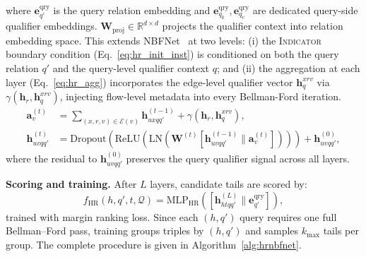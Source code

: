 \documentclass[10pt,journal,compsoc]{IEEEtran}
\begin{document}
where $\mathbf{e}_{q'}^{\mathrm{qry}}$ is the
query relation embedding and
$\mathbf{e}_{q_k}^{\mathrm{qry}},
\mathbf{e}_{q_v}^{\mathrm{qry}}$ are dedicated
query-side qualifier embeddings.
$\mathbf{W}_{\mathrm{proj}} \in
\mathbb{R}^{d \times d}$ projects the qualifier
context into relation embedding space. This extends
NBFNet~\cite{zhu2021neural} at two levels: (i) the
\textsc{Indicator} boundary condition
(Eq.~\ref{eq:hr_init_inst}) is conditioned on both
the query relation $q'$ and the query-level qualifier
context $q$; and (ii) the aggregation at each layer
(Eq.~\ref{eq:hr_agg}) incorporates the edge-level
qualifier vector $\mathbf{h}_q^{xrv}$ via
$\gamma(\mathbf{h}_r, \mathbf{h}_q^{xrv})$,
injecting flow-level metadata into every
Bellman-Ford iteration.
\begin{align}
  \mathbf{a}_v^{(t)}
  &= \sum_{(x,r,v)\in\mathcal{E}(v)}
     \mathbf{h}_{uxqq'}^{(t-1)}
     + \gamma(\mathbf{h}_r,\mathbf{h}_q^{xrv}),
  \label{eq:hr_agg} \\
  \mathbf{h}_{uvqq'}^{(t)}
  &= \mathrm{Dropout}(\mathrm{ReLU}(\mathrm{LN}(
     \mathbf{W}^{(t)}[\mathbf{h}_{uvqq'}^{(t-1)}
     \|\mathbf{a}_v^{(t)}])))
     + \mathbf{h}_{uvqq'}^{(0)},
  \label{eq:hr_update}
\end{align}
where the residual to $\mathbf{h}_{uvqq'}^{(0)}$
preserves the query qualifier signal across all layers.

\noindent\textbf{Scoring and training.}
After $L$ layers, candidate tails are scored by:
\begin{equation}
  f_{\mathrm{HR}}(h,q',t,\mathcal{Q})
  = \mathrm{MLP}_{\mathrm{HR}}\!\left(
      [\mathbf{h}_{htqq'}^{(L)}
      \|\mathbf{e}_{q'}^{\mathrm{qry}}]
    \right),
  \label{eq:hr_score}
\end{equation}
trained with margin ranking loss.
Since each $(h,q')$ query requires one full
Bellman--Ford pass, training groups triples by
$(h,q')$ and samples $k_{\max}$ tails per group.
The complete procedure is given in
Algorithm~\ref{alg:hrnbfnet}.
\end{document}
